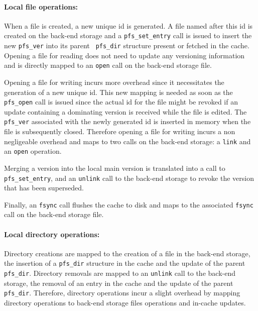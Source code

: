 \paragraph{Local file operations:}
When a file is created, a new unique id is generated. A file named
after this id is created on the back-end storage and a {\tt pfs\_set\_entry}
call is issued to insert the new {\tt pfs\_ver} into its parent {\tt
  pfs\_dir} structure present or fetched in the cache.  Opening a file
for reading does not need to update any versioning information and is
directly mapped to an {\tt open} call on the back-end storage file.

Opening a file for writing incurs more overhead since it necessitates
the generation of a new unique id. This new mapping is needed as soon
as the {\tt pfs\_open} call is issued since the actual id for the file
might be revoked if an update containing a dominating version is
received while the file is edited. The {\tt pfs\_ver} associated with
the newly generated id is inserted in memory when the file is
subsequently closed. Therefore opening a file for writing incurs a non
negligeable overhead and maps to two calls on the back-end storage: a
{\tt link} and an {\tt open} operation.

Merging a version into the local main version is translated into a
call to {\tt pfs\_set\_entry}, and an {\tt unlink} call to the back-end
storage to revoke the version that has been superseded.

Finally, an {\tt fsync} call flushes the cache to disk and maps to the
associated {\tt fsync} call on the back-end storage file.

\paragraph{Local directory operations:}
Directory creations are mapped to the creation of a file in the
back-end storage, the insertion of a {\tt pfs\_dir} structure in the
cache and the update of the parent {\tt pfs\_dir}. Directory removals
are mapped to an {\tt unlink} call to the back-end storage, the
removal of an entry in the cache and the update of the parent {\tt
  pfs\_dir}. Therefore, directory operations incur a slight overhead
by mapping directory operations to back-end storage files operations
and in-cache updates.


\paragraph{}

